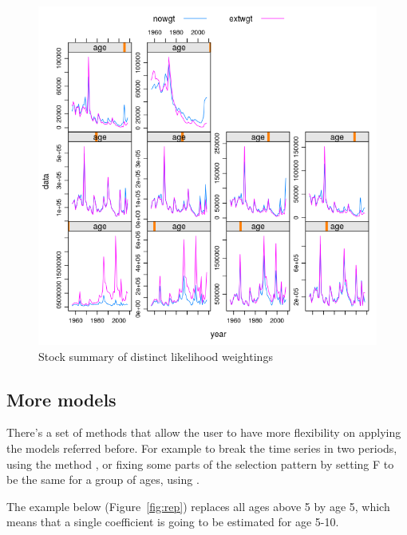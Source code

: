 \documentclass[a4paper,english,10pt]{article}\usepackage[]{graphicx}\usepackage[]{color}
\makeatletter
\def\maxwidth{ %
  \ifdim\Gin@nat@width>\linewidth
    \linewidth
  \else
    \Gin@nat@width
  \fi
}
\newenvironment{knitrout}{}{} %
\makeatother
\begin{document}
\begin{knitrout}
\color{fgcolor}\begin{figure}[H]

{\centering \includegraphics[width=\maxwidth]{figure/likwgt-1} 

}

\caption[Stock summary of distinct likelihood weightings]{Stock summary of distinct likelihood weightings}\label{fig:likwgt}
\end{figure}


\end{knitrout}

\subsection{More models}

There's a set of methods that allow the user to have more flexibility on applying the models referred before. For example to break the time series in two periods, using the method , or fixing some parts of the selection pattern by setting F to be the same for a group of ages, using .

The example below (Figure~\ref{fig:rep}) replaces all ages above 5 by age 5, which means that a single coefficient is going to be estimated for age 5-10.
\end{document}
